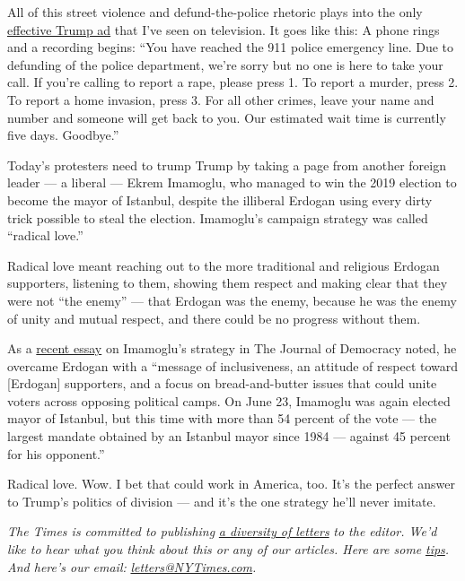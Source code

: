 All of this street violence and defund-the-police rhetoric plays into
the only
\href{https://www.nytimes3xbfgragh.onion/2020/07/21/us/politics/trump-portland-federal-agents.html}{effective
Trump ad} that I've seen on television. It goes like this: A phone rings
and a recording begins: ``You have reached the 911 police emergency
line. Due to defunding of the police department, we're sorry but no one
is here to take your call. If you're calling to report a rape, please
press 1. To report a murder, press 2. To report a home invasion, press
3. For all other crimes, leave your name and number and someone will get
back to you. Our estimated wait time is currently five days. Goodbye.''

Today's protesters need to trump Trump by taking a page from another
foreign leader --- a liberal --- Ekrem Imamoglu, who managed to win the
2019 election to become the mayor of Istanbul, despite the illiberal
Erdogan using every dirty trick possible to steal the election.
Imamoglu's campaign strategy was called ``radical love.''

Radical love meant reaching out to the more traditional and religious
Erdogan supporters, listening to them, showing them respect and making
clear that they were not ``the enemy'' --- that Erdogan was the enemy,
because he was the enemy of unity and mutual respect, and there could be
no progress without them.

As a
\href{https://www.journalofdemocracy.org/articles/the-pushback-against-populism-running-on-radical-love-in-turkey/}{recent
essay} on Imamoglu's strategy in The Journal of Democracy noted, he
overcame Erdogan with a ``message of inclusiveness, an attitude of
respect toward {[}Erdogan{]} supporters, and a focus on bread-and-butter
issues that could unite voters across opposing political camps. On June
23, Imamoglu was again elected mayor of Istanbul, but this time with
more than 54 percent of the vote --- the largest mandate obtained by an
Istanbul mayor since 1984 --- against 45 percent for his opponent.''

Radical love. Wow. I bet that could work in America, too. It's the
perfect answer to Trump's politics of division --- and it's the one
strategy he'll never imitate.

\emph{The Times is committed to publishing}
\href{https://www.nytimes3xbfgragh.onion/2019/01/31/opinion/letters/letters-to-editor-new-york-times-women.html}{\emph{a
diversity of letters}} \emph{to the editor. We'd like to hear what you
think about this or any of our articles. Here are some}
\href{https://help.nytimes3xbfgragh.onion/hc/en-us/articles/115014925288-How-to-submit-a-letter-to-the-editor}{\emph{tips}}\emph{.
And here's our email:}
\href{mailto:letters@NYTimes.com}{\emph{letters@NYTimes.com}}\emph{.}

